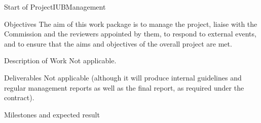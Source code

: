 \documentclass{euproposal}
\begin{document}
\begin{workpackage}{36}{0}{Start of Project}{IUB}{Management}
\begin{wpbox}{Objectives}
  The aim of this work package is to manage the project, liaise with
  the Commission and the reviewers appointed by them, to respond to
  external events, and to ensure that the aims and objectives of the
  overall project are met.
\end{wpbox}
\begin{wpbox}{Description of Work}
Not applicable.
\end{wpbox}
\begin{wpbox}{Deliverables}
Not applicable (although it will produce internal guidelines
and regular management reports as well as the final report, as 
required under the contract).
\end{wpbox}
\begin{wpbox}{Milestones and expected result}
\end{wpbox}
\end{workpackage}
\newpage
\end{document}
